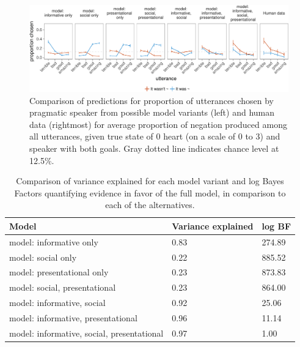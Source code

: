 \documentclass[12pt]{article}
\begin{document}
\begin{figure}
\centering
\includegraphics[width=\textwidth]{polite_manuscript_files/figure-latex/comparison-1.pdf}
\caption{\label{fig:comparison}Comparison of predictions for proportion of
utterances chosen by pragmatic speaker from possible model variants
(left) and human data (rightmost) for average proportion of negation
produced among all utterances, given true state of 0 heart (on a scale
of 0 to 3) and speaker with both goals. Gray dotted line indicates
chance level at 12.5\%.}
\end{figure}

\begin{table}[tbp]
\begin{center}
\begin{threeparttable}
\caption{\label{tab:comparisonTable}Comparison of variance explained for each model variant and log Bayes Factors quantifying evidence in favor of the full model, in comparison to each of the alternatives.}
\begin{tabular}{lll}
\toprule
Model & \multicolumn{1}{c}{Variance 
explained} & \multicolumn{1}{c}{log BF}\\
\midrule
model: 
informative only & 0.83 & 274.89\\
model: 
social only & 0.22 & 885.52\\
model: 
presentational 
only & 0.23 & 873.83\\
model: 
social, 
presentational & 0.23 & 864.00\\
model: 
informative, 
social & 0.92 & 25.06\\
model: 
informative, 
presentational & 0.96 & 11.14\\
model: 
informative, 
social, 
presentational & 0.97 & 1.00\\
\bottomrule
\end{tabular}
\end{threeparttable}
\end{center}
\end{table}
\end{document}
